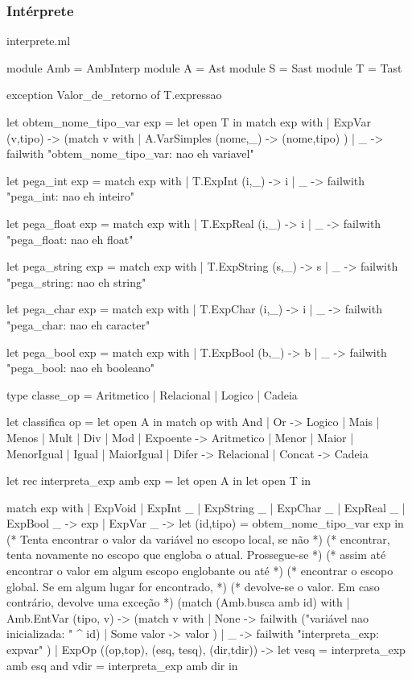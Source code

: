 \documentclass[12pt,a4paper,twoside]{article}
\begin{document}
\subsubsection{Intérprete}
interprete.ml
\begin{terminal}
module Amb = AmbInterp
module A = Ast
module S = Sast
module T = Tast

exception Valor_de_retorno of T.expressao

let obtem_nome_tipo_var exp = let open T in
  match exp with
  | ExpVar (v,tipo) ->
    (match v with
      | A.VarSimples (nome,_) -> (nome,tipo)
    )
  | _ -> failwith "obtem_nome_tipo_var: nao eh variavel"

let pega_int exp =
  match exp with
  |  T.ExpInt (i,_) -> i
  | _ -> failwith "pega_int: nao eh inteiro"

let pega_float exp =
  match exp with
  |  T.ExpReal (i,_) -> i
  | _ -> failwith "pega_float: nao eh float"

let pega_string exp =
  match exp with
  |  T.ExpString (s,_) -> s
  | _ -> failwith "pega_string: nao eh string"

let pega_char exp =
  match exp with
  |  T.ExpChar (i,_) -> i
  | _ -> failwith "pega_char: nao eh caracter"

let pega_bool exp =
  match exp with
  |  T.ExpBool (b,_) -> b
  | _ -> failwith "pega_bool: nao eh booleano"

type classe_op = Aritmetico | Relacional | Logico | Cadeia

let classifica op =
  let open A in
  match op with
   And
  | Or -> Logico
  | Mais
  | Menos
  | Mult
  | Div
  | Mod
  | Expoente -> Aritmetico
  | Menor
  | Maior
  | MenorIgual
  | Igual
  | MaiorIgual
  | Difer -> Relacional
  | Concat -> Cadeia
  

let rec interpreta_exp amb exp =
let open A in
let open T in

  match exp with
  | ExpVoid
  | ExpInt _
  | ExpString _
  | ExpChar _
  | ExpReal _
  | ExpBool _   -> exp
  | ExpVar _ ->
    let (id,tipo) = obtem_nome_tipo_var exp in
    (* Tenta encontrar o valor da variável no escopo local, se não      *)
    (* encontrar, tenta novamente no escopo que engloba o atual. Prossegue-se *)
    (* assim até encontrar o valor em algum escopo englobante ou até    *)
    (* encontrar o escopo global. Se em algum lugar for encontrado,         *)
    (* devolve-se o valor. Em caso contrário, devolve uma exceção       *)
    (match (Amb.busca amb id) with
     | Amb.EntVar (tipo, v) ->
       (match v with
        | None -> failwith ("variável nao inicializada: " ^ id)
        | Some valor -> valor
       )
     |  _ -> failwith "interpreta_exp: expvar"
    )
  | ExpOp ((op,top), (esq, tesq), (dir,tdir)) ->
    let  vesq = interpreta_exp amb esq
    and vdir = interpreta_exp amb dir in


\end{terminal}
\end{document}
